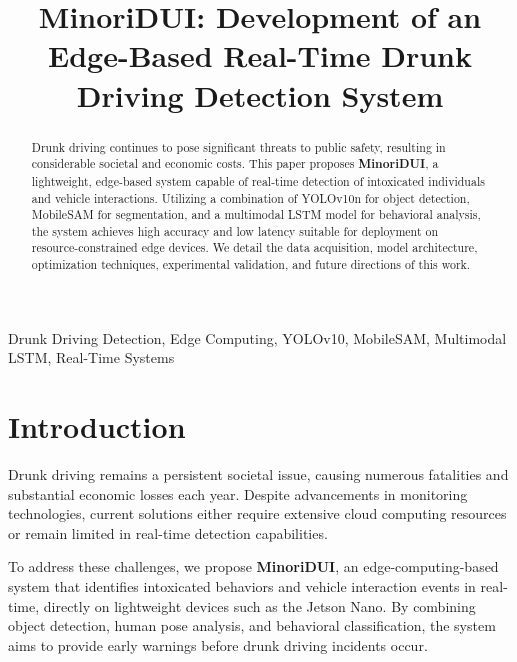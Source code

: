\documentclass[conference]{IEEEtran}
\begin{document}
\title{MinoriDUI: Development of an Edge-Based Real-Time Drunk Driving Detection System}

\author{
}

\maketitle

\begin{abstract}
Drunk driving continues to pose significant threats to public safety, resulting in considerable societal and economic costs. This paper proposes \textbf{MinoriDUI}, a lightweight, edge-based system capable of real-time detection of intoxicated individuals and vehicle interactions. Utilizing a combination of YOLOv10n for object detection, MobileSAM for segmentation, and a multimodal LSTM model for behavioral analysis, the system achieves high accuracy and low latency suitable for deployment on resource-constrained edge devices. We detail the data acquisition, model architecture, optimization techniques, experimental validation, and future directions of this work.
\end{abstract}

\begin{IEEEkeywords}
Drunk Driving Detection, Edge Computing, YOLOv10, MobileSAM, Multimodal LSTM, Real-Time Systems
\end{IEEEkeywords}

\section{Introduction}
Drunk driving remains a persistent societal issue, causing numerous fatalities and substantial economic losses each year. Despite advancements in monitoring technologies, current solutions either require extensive cloud computing resources or remain limited in real-time detection capabilities.

To address these challenges, we propose \textbf{MinoriDUI}, an edge-computing-based system that identifies intoxicated behaviors and vehicle interaction events in real-time, directly on lightweight devices such as the Jetson Nano. By combining object detection, human pose analysis, and behavioral classification, the system aims to provide early warnings before drunk driving incidents occur.
\end{document}
